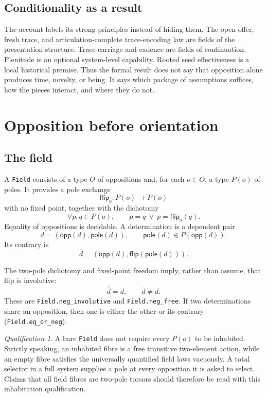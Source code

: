 \documentclass[11pt]{article}
\theoremstyle{definition}
\theoremstyle{remark}
\newtheorem*{qualification}{Qualification}
\newcommand{\lean}[1]{\nolinkurl{#1}}
\newcommand{\opp}{\mathsf{opp}}
\newcommand{\pole}{\mathsf{pole}}
\newcommand{\negd}[1]{\overline{#1}}
\begin{document}
\subsection{Conditionality as a result}

The account labels its strong principles instead of hiding them. The open
offer, fresh trace, and articulation-complete trace-encoding law are fields of the
presentation structure. Trace carriage and cadence are fields of
continuation. Plenitude is an optional system-level capability. Rooted seed
effectiveness is a local historical premise. Thus the formal result does not
say that opposition alone produces time, novelty, or being. It says which
package of assumptions suffices, how the pieces interact, and where they do
not.

\section{Opposition before orientation}

\subsection{The field}

A \lean{Field} consists of a type \(O\) of oppositions and, for each
\(o\in O\), a type \(P(o)\) of poles. It provides a pole exchange
\[
  \mathsf{flip}_o : P(o)\longrightarrow P(o)
\]
with no fixed point, together with the dichotomy
\[
  \forall p,q\in P(o),\qquad p=q\ \lor\ p=\mathsf{flip}_o(q).
\]
Equality of oppositions is decidable. A determination is a dependent pair
\[
  d=(\opp(d),\pole(d)),\qquad \pole(d)\in P(\opp(d)).
\]
Its contrary is
\[
  \negd d=(\opp(d),\mathsf{flip}(\pole(d))).
\]

The two-pole dichotomy and fixed-point freedom imply, rather than assume, that
flip is involutive:
\[
  \negd{\negd d}=d,\qquad \negd d\neq d.
\]
These are \lean{Field.neg_involutive} and \lean{Field.neg_free}. If two
determinations share an opposition, then one is either the other or its
contrary (\lean{Field.eq_or_neg}).

\begin{qualification}
A bare \lean{Field} does not require every \(P(o)\) to be inhabited. Strictly
speaking, an inhabited fibre is a free transitive two-element action, while an
empty fibre satisfies the universally quantified field laws vacuously. A
total selector in a full system supplies a pole at every opposition it is
asked to select. Claims that all field fibres are two-pole torsors should
therefore be read with this inhabitation qualification.
\end{qualification}
\end{document}
